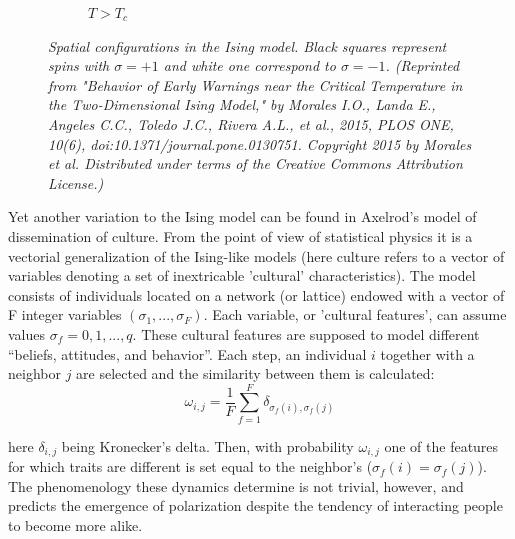 \documentclass[12pt,openright,twoside]{book}
\begin{document}
\begin{figure}
\begin{subfigure}[b]{0.3\linewidth}
    \caption{$T>T_c$}
\end{subfigure}
\caption{\textit{{\small Spatial configurations in the Ising model. Black squares represent spins with $\sigma=+1$ and white one correspond to $\sigma=-1$. (Reprinted from "Behavior of Early Warnings near the Critical Temperature in the Two-Dimensional Ising Model," by Morales I.O., Landa E., Angeles C.C., Toledo J.C., Rivera A.L., et al., 2015, PLOS ONE, 10(6), doi:10.1371/journal.pone.0130751. Copyright 2015 by Morales et al. Distributed under terms of the Creative Commons Attribution License.)}}}
\label{quench}
\end{figure}

Yet another variation to the Ising model can be found in Axelrod's model of dissemination of culture\cite{axelrod_1997}. From the point of view of statistical physics it is a vectorial generalization of the Ising-like models (here culture refers to a vector of variables denoting a set of inextricable 'cultural' characteristics). The model consists of individuals located on a network (or lattice) endowed with a vector of F integer variables $(\sigma_1,...,\sigma_F)$. Each variable, or 'cultural features', can assume values $\sigma_f=0,1,...,q$. These cultural features are supposed to model different “beliefs, attitudes, and behavior”. Each step, an individual $i$ together with a neighbor $j$ are selected and the similarity between them is calculated:\\

\begin{equation}
\omega_{i,j}=\frac{1}{F}\sum^F_{f=1}\delta_{\sigma_f(i),\sigma_f(j)}
\label{axelrod-probability}
\end{equation}

\vspace{14pt}

here $\delta_{i,j}$ being Kronecker's delta. Then, with probability $\omega_{i,j}$ one of the features for which traits are different is set equal to the neighbor's ($\sigma_f(i)=\sigma_f(j)$). The phenomenology these dynamics determine is not trivial, however, and predicts the emergence of polarization despite the tendency of interacting people to become more alike.
\end{document}
